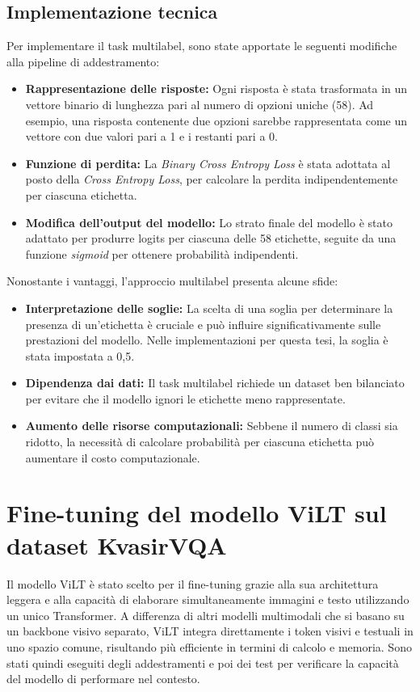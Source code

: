 \documentclass[../main.tex]{subfiles}
\begin{document}
\subsection{Implementazione tecnica}

Per implementare il task multilabel, sono state apportate le seguenti modifiche alla pipeline di addestramento:
\begin{itemize}
    \item \textbf{Rappresentazione delle risposte:} Ogni risposta è stata trasformata in un vettore binario di lunghezza pari al numero di opzioni uniche (58). Ad esempio, una risposta contenente due opzioni sarebbe rappresentata come un vettore con due valori pari a 1 e i restanti pari a 0.
    \item \textbf{Funzione di perdita:} La \textit{Binary Cross Entropy Loss} è stata adottata al posto della \textit{Cross Entropy Loss}, per calcolare la perdita indipendentemente per ciascuna etichetta.
    \item \textbf{Modifica dell'output del modello:} Lo strato finale del modello è stato adattato per produrre logits per ciascuna delle 58 etichette, seguite da una funzione \textit{sigmoid} per ottenere probabilità indipendenti.
\end{itemize}

Nonostante i vantaggi, l'approccio multilabel presenta alcune sfide:
\begin{itemize}
    \item \textbf{Interpretazione delle soglie:} La scelta di una soglia per determinare la presenza di un'etichetta è cruciale e può influire significativamente sulle prestazioni del modello. Nelle implementazioni per questa tesi, la soglia è stata impostata a 0,5.
    \item \textbf{Dipendenza dai dati:} Il task multilabel richiede un dataset ben bilanciato per evitare che il modello ignori le etichette meno rappresentate.
    \item \textbf{Aumento delle risorse computazionali:} Sebbene il numero di classi sia ridotto, la necessità di calcolare probabilità per ciascuna etichetta può aumentare il costo computazionale.
\end{itemize}

\section{Fine-tuning del modello ViLT sul dataset KvasirVQA}

Il modello ViLT è stato scelto per il fine-tuning grazie alla sua architettura leggera e alla capacità di elaborare simultaneamente immagini e testo utilizzando un unico Transformer. A differenza di altri modelli multimodali che si basano su un backbone visivo separato, ViLT integra direttamente i token visivi e testuali in uno spazio comune, risultando più efficiente in termini di calcolo e memoria.
Sono stati quindi eseguiti degli addestramenti e poi dei test per verificare la capacità del modello di performare nel contesto.
\end{document}
